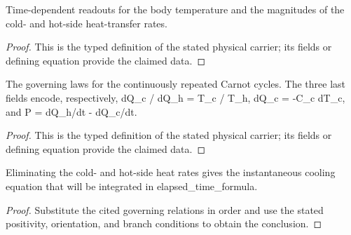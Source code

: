 \begin{definition}
  \label{def:physics:IPhO_2026_3_C_4:aux012}
  Time-dependent readouts for the body temperature and the magnitudes of the cold- and hot-side heat-transfer rates.
\end{definition}
\begin{proof}
  This is the typed definition of the stated physical carrier; its fields or defining equation provide the claimed data.
\end{proof}

\begin{definition}
  \label{def:physics:IPhO_2026_3_C_4:aux013}
  The governing laws for the continuously repeated Carnot cycles. The three last fields encode, respectively, dQ\_c / dQ\_h = T\_c / T\_h, dQ\_c = -C\_c dT\_c, and P = dQ\_h/dt - dQ\_c/dt.
\end{definition}
\begin{proof}
  This is the typed definition of the stated physical carrier; its fields or defining equation provide the claimed data.
\end{proof}

\begin{lemma}
  \label{lem:physics:IPhO_2026_3_C_4:aux014}
  Eliminating the cold- and hot-side heat rates gives the instantaneous cooling equation that will be integrated in elapsed\_time\_formula.
\end{lemma}
\begin{proof}
  Substitute the cited governing relations in order and use the stated positivity, orientation, and branch conditions to obtain the conclusion.
\end{proof}
